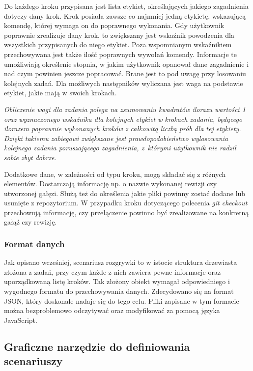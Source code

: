 \documentclass[11pt,a4paper,polish,thesis]{dcsbook}
\begin{document}
	Do każdego kroku przypisana jest lista etykiet, określających jakiego zagadnienia dotyczy dany krok. Krok posiada zawsze co najmniej jedną etykietę, wskazującą komendę, której wymaga on do poprawnego wykonania. Gdy użytkownik poprawnie zrealizuje dany krok, to zwiększany jest wskaźnik powodzenia dla wszystkich przypisanych do niego etykiet. Poza wspomnianym wskaźnikiem przechowywana jest także ilość poprawnych wywołań komendy. Informacje te umożliwiają określenie stopnia, w jakim użytkownik opanował dane zagadnienie i nad czym powinien jeszcze popracować. Brane jest to pod uwagę przy losowaniu kolejnych zadań. Dla możliwych następników wyliczana jest waga na podstawie etykiet, jakie mają w swoich krokach. 
	
	\textit{Obliczenie wagi dla zadania polega na zsumowaniu kwadratów ilorazu wartości 1 oraz wyznaczonego wskaźnika dla kolejnych etykiet w krokach zadania, będącego ilorazem poprawnie wykonanych kroków z całkowitą liczbą prób dla tej etykiety. Dzięki takiemu zabiegowi zwiększane jest prawdopodobieństwo wylosowania kolejnego zadania poruszającego zagadnienia, z~którymi użytkownik nie radził sobie zbyt dobrze.}
	
	Dodatkowe dane, w zależności od typu kroku, mogą składać się z różnych elementów. Dostarczają informację np. o nazwie wykonanej rewizji czy utworzonej gałęzi. Służą też do określenia jakie pliki powinny zostać dodane lub usunięte z repozytorium. W przypadku kroku dotyczącego polecenia \textit{git checkout} przechowują informację, czy przełączenie powinno być zrealizowane na konkretną gałąź czy rewizję.
	
	\subsubsection{Format danych}
	
	Jak opisano wcześniej, scenariusz rozgrywki to w istocie struktura drzewiasta złożona z zadań, przy czym każde z nich zawiera pewne informacje oraz uporządkowaną listę kroków. Tak złożony obiekt wymagał odpowiedniego i wygodnego formatu do przechowywania danych. Zdecydowano się na format JSON, który doskonale nadaje się do tego celu. Pliki zapisane w tym formacie można bezproblemowo odczytywać oraz modyfikować za pomocą języka JavaScript.
	
	\subsection{Graficzne narzędzie do definiowania scenariuszy}
	
\end{document}
